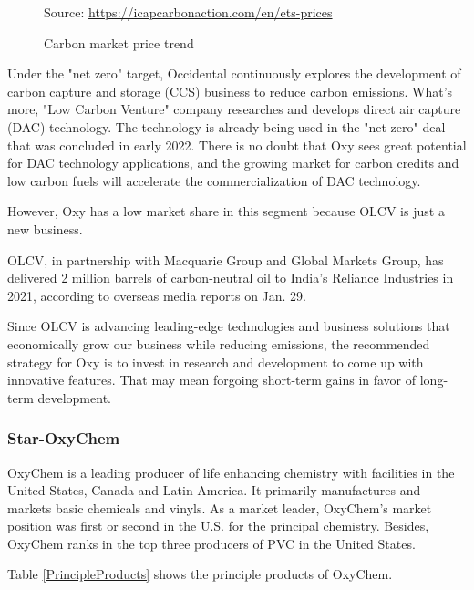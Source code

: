 \documentclass[
	a4paper, %
	12pt,%
]{CSSullivanBusinessReport}
\begin{document}
\begin{fullwidth}
\begin{figure}[H]
    \caption{Carbon market price trend}
    Source: \url{https://icapcarbonaction.com/en/ets-prices}
    \label{CarbonMarketPrice}
\end{figure}
Under the "net zero" target, Occidental continuously explores the development of carbon capture and storage (CCS) business to reduce carbon emissions. What's more, "Low Carbon Venture" company researches and develops direct air capture (DAC) technology. The technology is already being used in the "net zero" deal that was concluded in early 2022. There is no doubt that Oxy sees great potential for DAC technology applications, and the growing market for carbon credits and low carbon fuels will accelerate the commercialization of DAC technology.

However, Oxy has a low market share in this segment because OLCV is just a new business. \par
OLCV, in partnership with Macquarie Group and Global Markets Group, has delivered 2 million barrels of carbon-neutral oil to India's Reliance Industries in 2021, according to overseas media reports on Jan. 29. \par 
Since OLCV is advancing leading-edge technologies and business solutions that economically grow our business while reducing emissions, the recommended strategy for Oxy is to invest in research and development to come up with innovative features. That may mean forgoing short-term gains in favor of long-term development.

\subsubsection{Star-OxyChem}
OxyChem is a leading producer of life enhancing chemistry with facilities in the United States, Canada and Latin America. It primarily manufactures and markets basic chemicals and vinyls. As a market leader, OxyChem's market position was first or second in the U.S. for the principal chemistry. Besides, OxyChem ranks in the top three producers of PVC in the United States.
\par
Table \ref{PrincipleProducts} shows the principle products of OxyChem.


\end{fullwidth}
\end{document}
